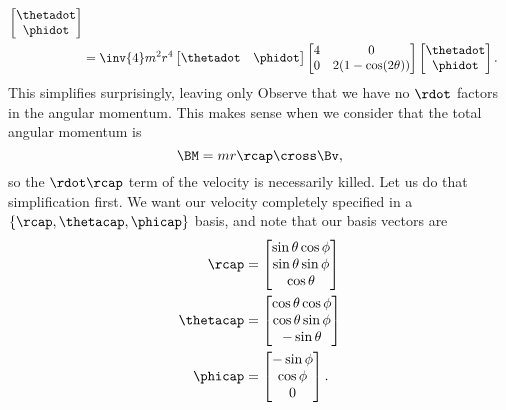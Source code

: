 {\begin{equation}
\begin{aligned}
\begin{bmatrix}
\thetadot \\
\phidot
\end{bmatrix}  \\
&=
\inv{4} m^2 r^4
\begin{bmatrix}
\thetadot & \phidot
\end{bmatrix}
\begin{bmatrix}
4 & 0 \\
0 & 2(1 - \cos(2\theta))
\end{bmatrix}
\begin{bmatrix}
\thetadot \\
\phidot
\end{bmatrix}.
\end{aligned}
\end{equation}
%
This simplifies surprisingly, leaving only
%
%
%
Observe that we have no \(\rdot\) factors in the angular momentum.  This makes sense when we consider that the total angular momentum is
%
\begin{dmath}\label{eqn:classicalMechanicsPs2:190}
\BM = m r \rcap \cross \Bv,
\end{dmath}
%
so the \(\rdot \rcap\) term of the velocity is necessarily killed.  Let us do that simplification first.  We want our velocity completely specified in a \(\{\rcap, \thetacap, \phicap\}\) basis, and note that our basis vectors are
%
\begin{equation}\label{eqn:classicalMechanicsPs2:210}
\begin{aligned}
\rcap &=
\begin{bmatrix}
\sin\theta \cos\phi \\
\sin\theta \sin\phi \\
\cos\theta
\end{bmatrix} \\
\thetacap &=
\begin{bmatrix}
\cos\theta \cos\phi \\
\cos\theta \sin\phi \\
-\sin\theta
\end{bmatrix} \\
\phicap &=
\begin{bmatrix}
-\sin\phi \\
\cos\phi \\
0
\end{bmatrix} .

\end{aligned}
\end{equation}}
